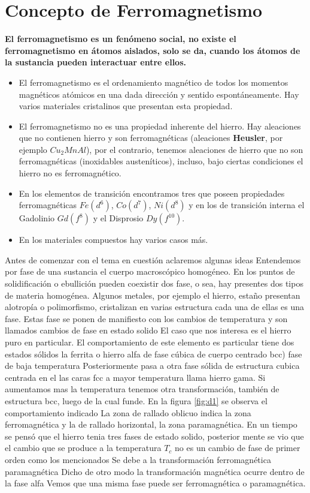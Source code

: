 \section{Concepto de Ferromagnetismo}

\textbf{El ferromagnetismo es un fenómeno social, no existe el ferromagnetismo en átomos aislados, solo se da, cuando los átomos de la sustancia pueden interactuar entre ellos.}

\begin{itemize}
	\item El ferromagnetismo es el ordenamiento magnético de todos los momentos magnéticos atómicos en una dada dirección y sentido espontáneamente. Hay varios materiales cristalinos que presentan esta propiedad.
	
	\item El ferromagnetismo no es una propiedad inherente del hierro. Hay aleaciones que no contienen hierro y son ferromagnéticas (aleaciones \textbf{Heusler}, por ejemplo $Cu_{2}MnAl$), por el contrario, tenemos aleaciones de hierro que no son ferromagnéticas (inoxidables austeníticos), incluso, bajo ciertas condiciones el hierro no es ferromagnético.

	\item En los elementos de transición encontramos tres que poseen propiedades ferromagnéticas $Fe(d^{6})$, $Co(d^{7})$, $Ni(d^{8})$ y en los de transición interna el Gadolinio $Gd(f^{8})$ y el Disprosio $Dy(f^{10})$.

	\item En los materiales compuestos hay varios casos más.

\end{itemize}


Antes de comenzar con el tema en cuestión aclaremos algunas ideas Entendemos por fase de una sustancia el cuerpo macroscópico homogéneo. En los puntos de solidificación o ebullición pueden coexistir dos fase, o sea, hay presentes dos tipos de materia homogénea. Algunos metales, por ejemplo el hierro, estaño presentan alotropía o polimorfismo, cristalizan en varias estructura cada una de ellas es una fase. Estas fase se ponen de manifiesto con los cambios de temperatura y son llamados cambios de fase en estado solido El caso que nos interesa es el hierro puro en particular. El comportamiento de este elemento es particular tiene dos estados sólidos la ferrita o hierro alfa de fase cúbica de cuerpo centrado bcc) fase de baja temperatura Posteriormente pasa a otra fase sólida de estructura cubica centrada en el las caras fcc a mayor temperatura llama hierro gama. Si aumentamos mas la temperatura tenemos otra transformación, también de estructura bcc, luego de la cual funde. En la figura \ref{fig:d1} se observa el comportamiento indicado La zona de rallado oblicuo indica la zona ferromagnética y la de rallado horizontal, la zona paramagnética. En un tiempo se pensó que el hierro tenia tres fases de estado solido, posterior mente se vio que el cambio que se produce a la temperatura $T_{c}$ no es un cambio de fase de primer orden como los mencionados Se debe a la transformación ferromagnética paramagnética Dicho de otro modo la transformación magnética ocurre dentro de la fase alfa Vemos que una misma fase puede ser ferromagnética o paramagnética.

